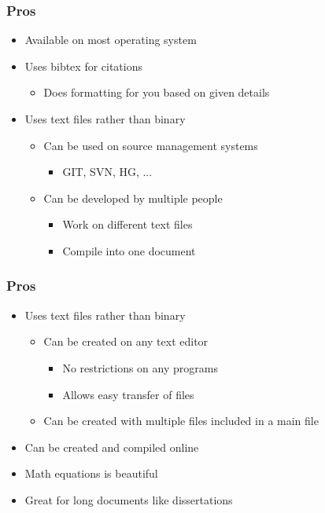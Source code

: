 \begin{frame}
\frametitle{Pros}
    \begin{itemize}
        \item Available on most operating system
        \item Uses bibtex for citations
        \begin{itemize}
            \item Does formatting for you based on given details
        \end{itemize}
        \item Uses text files rather than binary
        \begin{itemize}
            \item Can be used on source management systems
            \begin{itemize}
                \item GIT, SVN, HG, ...
            \end{itemize}
            \item Can be developed by multiple people
            \begin{itemize}
                \item Work on different text files
                \item Compile into one document
            \end{itemize}
        \end{itemize}
    \end{itemize}
\end{frame}


\begin{frame}
\frametitle{Pros}
    \begin{itemize}
        \item Uses text files rather than binary
        \begin{itemize}
            \item Can be created on any text editor
            \begin{itemize}
                \item No restrictions on any programs
                \item Allows easy transfer of files
            \end{itemize}
            \item Can be created with multiple files included in a main file
        \end{itemize}
        \item Can be created and compiled online
        \item Math equations is beautiful
        \item Great for long documents like dissertations
    \end{itemize}
\end{frame}



